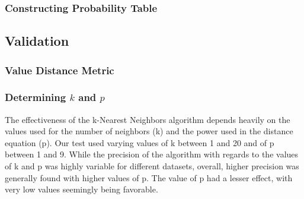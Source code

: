 \documentclass{article}
\begin{document}
		\subsubsection{Constructing Probability Table}
	\subsection{Validation}
		\subsubsection{Value Distance Metric}
		\subsubsection{Determining $k$ and $p$}
			The effectiveness of the k-Nearest Neighbors algorithm depends heavily on the values used for the number of neighbors (k) and the power used in the distance equation (p).  Our test used varying values of k between 1 and 20 and of p between 1 and 9.  While the precision of the algorithm with regards to the values of k and p was highly variable for different datasets, overall, higher precision was generally found with higher values of p.  The value of p had a lesser effect, with very low values seemingly being favorable.
\end{document}
